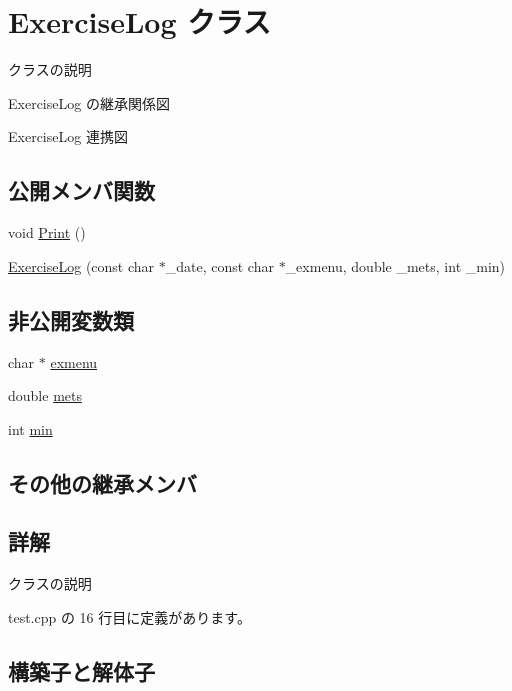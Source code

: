 \hypertarget{class_exercise_log}{}\section{Exercise\+Log クラス}
\label{class_exercise_log}


クラスの説明  




Exercise\+Log の継承関係図


Exercise\+Log 連携図
\subsection*{公開メンバ関数}
\begin{DoxyCompactItemize}
\item 
void \hyperlink{class_exercise_log_aba1a88ed0b4e6d17843cab673210942c}{Print} ()
\item 
\hyperlink{class_exercise_log_a54052316d7c4e8a9b260e1d9aca5bb75}{Exercise\+Log} (const char $\ast$\+\_\+date, const char $\ast$\+\_\+exmenu, double \+\_\+mets, int \+\_\+min)
\end{DoxyCompactItemize}
\subsection*{非公開変数類}
\begin{DoxyCompactItemize}
\item 
char $\ast$ \hyperlink{class_exercise_log_aa7d8e7d8b226d049d279912b9fc0fd5b}{exmenu}
\item 
double \hyperlink{class_exercise_log_a511c5c637f86192270d0588fd7b0c5ee}{mets}
\item 
int \hyperlink{class_exercise_log_a9fc8d465bb5d443970799bafd82441a4}{min}
\end{DoxyCompactItemize}
\subsection*{その他の継承メンバ}


\subsection{詳解}
クラスの説明 

 test.\+cpp の 16 行目に定義があります。



\subsection{構築子と解体子}
\mbox{\label{class_exercise_log_a54052316d7c4e8a9b260e1d9aca5bb75}} 
